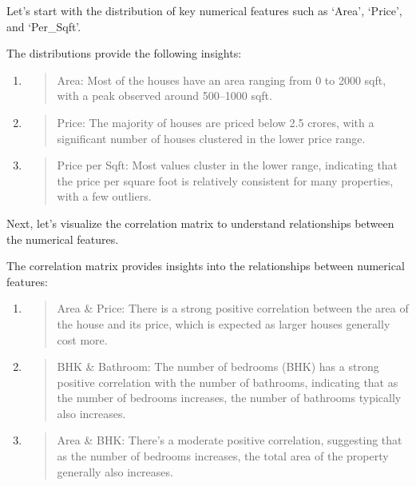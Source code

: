 \documentclass[]{article}
\begin{document}
Let's start with the distribution of key numerical features such as
`Area', `Price', and `Per\_Sqft'.

The distributions provide the following insights:

\begin{enumerate}
\def\labelenumi{\arabic{enumi}.}
\item
  \begin{quote}
  Area: Most of the houses have an area ranging from 0 to 2000 sqft,
  with a peak observed around 500--1000 sqft.
  \end{quote}
\item
  \begin{quote}
  Price: The majority of houses are priced below 2.5 crores, with a
  significant number of houses clustered in the lower price range.
  \end{quote}
\item
  \begin{quote}
  Price per Sqft: Most values cluster in the lower range, indicating
  that the price per square foot is relatively consistent for many
  properties, with a few outliers.
  \end{quote}
\end{enumerate}

Next, let's visualize the correlation matrix to understand relationships
between the numerical features.

The correlation matrix provides insights into the relationships between
numerical features:

\begin{enumerate}
\def\labelenumi{\arabic{enumi}.}
\item
  \begin{quote}
  Area \& Price: There is a strong positive correlation between the area
  of the house and its price, which is expected as larger houses
  generally cost more.
  \end{quote}
\item
  \begin{quote}
  BHK \& Bathroom: The number of bedrooms (BHK) has a strong positive
  correlation with the number of bathrooms, indicating that as the
  number of bedrooms increases, the number of bathrooms typically also
  increases.
  \end{quote}
\item
  \begin{quote}
  Area \& BHK: There's a moderate positive correlation, suggesting that
  as the number of bedrooms increases, the total area of the property
  generally also increases.
  \end{quote}
\end{enumerate}
\end{document}

